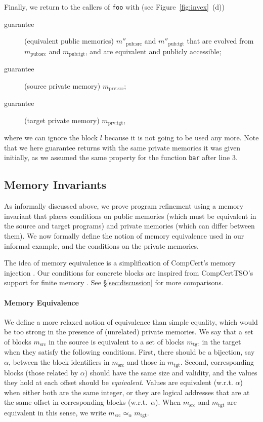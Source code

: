 Finally, we return to the callers of \texttt{foo} with (see Figure~\ref{fig:invex}~(d))
\begin{description}
\item[guarantee] (equivalent public memories) 
  $m''_\textrm{pub:src}$ and $m''_\textrm{pub:tgt}$
  that are evolved from $m_\textrm{pub:src}$ and $m_\textrm{pub:tgt}$,
  and are equivalent and publicly accessible;
\item[guarantee] (source private memory) 
  $m_\textrm{prv:src}$;
\item[guarantee] (target private memory) 
  $m_\textrm{prv:tgt}$,
\end{description}
where we can ignore the block $l$ because it is not going to be used any more.
Note that we here guarantee  returns with the same private memories it was given
initially, as we assumed the same property for the function
\texttt{bar} after line 3.

\subsection{Memory Invariants}
\label{reasoning:invariants}

As informally discussed above, we prove program refinement using a memory invariant that places conditions on
public memories (which must be equivalent in the source and target programs) and private memories (which can differ between them).  We now formally define the
notion of memory equivalence used in our informal
example, and the conditions on the private memories.

The idea of memory equivalence is a simplification of CompCert's
memory injection \cite{Leroy-Appel-Blazy-Stewart-memory-v2}.  Our
conditions for concrete blocks are inspired from CompCertTSO's support
for finite memory \cite{vsevvcik2013compcerttso}.  See
\S\ref{sec:discussion} for more comparisons.


\paragraph{Memory Equivalence}
We define a more relaxed notion of equivalence than simple equality,
which would be too strong in the presence of (unrelated) private
memories. We say that a set of blocks $m_\textrm{src}$ in the source
is equivalent to a set of blocks $m_\textrm{tgt}$ in the target
when they satisfy the following conditions. First, there should be a
bijection, say $\alpha$, between the block identifiers in
$m_\textrm{src}$ and those in $m_\textrm{tgt}$. Second, corresponding
blocks (\ie those related by $\alpha$) should have the same
size and validity, and the values they hold at each offset should be \emph{equivalent}.  Values are
equivalent (w.r.t. $\alpha$) when either both are the same integer, or
they are logical addresses that are at the same offset in corresponding blocks
(w.r.t.~$\alpha$). When $m_\textrm{src}$ and $m_\textrm{tgt}$ are equivalent in this sense, we write $m_\textrm{src} \simeq_\alpha m_\textrm{tgt}$.

